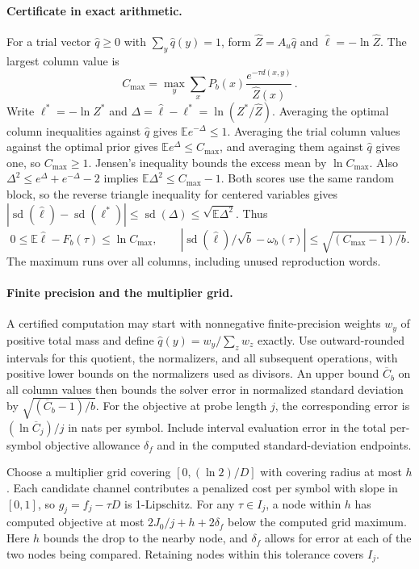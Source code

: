 \documentclass[11pt,letterpaper]{article}
\theoremstyle{definition}
\newcommand{\E}{\mathbb E}
\newcommand{\sd}{\operatorname{sd}}
\begin{document}
\paragraph{Certificate in exact arithmetic.}
For a trial vector $\hat q\ge0$ with $\sum_y\hat q(y)=1$, form $\hat Z=A_u\hat q$ and $\hat\ell=-\ln\hat Z$. The largest column value is
\[
 C_{\max}=\max_y\sum_x P_b(x)\frac{e^{-\tau d(x,y)}}{\hat Z(x)}\, .
\]
Write $\ell^*=-\ln Z^*$ and $\Delta=\hat\ell-\ell^*=\ln(Z^*/\hat Z)$. Averaging the optimal column inequalities against $\hat q$ gives $\E e^{-\Delta}\le1$. Averaging the trial column values against the optimal prior gives $\E e^\Delta\le C_{\max}$, and averaging them against $\hat q$ gives one, so $C_{\max}\ge1$. Jensen's inequality bounds the excess mean by $\ln C_{\max}$. Also $\Delta^2\le e^\Delta+e^{-\Delta}-2$ implies $\E\Delta^2\le C_{\max}-1$. Both scores use the same random block, so the reverse triangle inequality for centered variables gives $|\sd(\hat\ell)-\sd(\ell^*)|\le\sd(\Delta)\le\sqrt{\E\Delta^2}$. Thus
\[
 0\le\E\hat\ell-F_b(\tau)\le\ln C_{\max},\qquad
 \left|\sd(\hat\ell)/\sqrt b-\omega_b(\tau)\right|\le\sqrt{(C_{\max}-1)/b}.
\]
The maximum runs over all columns, including unused reproduction words.

\paragraph{Finite precision and the multiplier grid.}
A certified computation may start with nonnegative finite-precision weights $w_y$ of positive total mass and define $\hat q(y)=w_y/\sum_z w_z$ exactly. Use outward-rounded intervals for this quotient, the normalizers, and all subsequent operations, with positive lower bounds on the normalizers used as divisors. An upper bound $\overline C_b$ on all column values then bounds the solver error in normalized standard deviation by $\sqrt{(\overline C_b-1)/b}$. For the objective at probe length $j$, the corresponding error is $(\ln\overline C_j)/j$ in nats per symbol. Include interval evaluation error in the total per-symbol objective allowance $\delta_f$ and in the computed standard-deviation endpoints.

Choose a multiplier grid covering $[0,(\ln2)/D]$ with covering radius at most $h$. Each candidate channel contributes a penalized cost per symbol with slope in $[0,1]$, so $g_j=f_j-\tau D$ is 1-Lipschitz. For any $\tau\in I_j$, a node within $h$ has computed objective at most $2J_0/j+h+2\delta_f$ below the computed grid maximum. Here $h$ bounds the drop to the nearby node, and $\delta_f$ allows for error at each of the two nodes being compared. Retaining nodes within this tolerance covers $I_j$.
\end{document}

